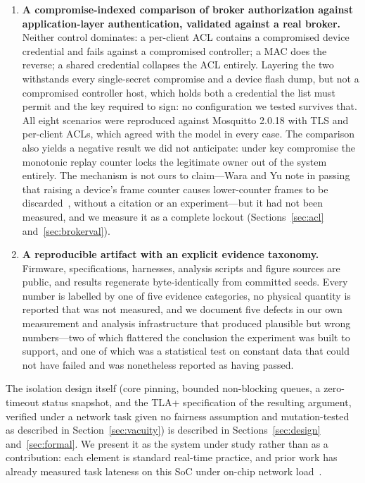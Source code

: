 \begin{enumerate}[leftmargin=1.4em,itemsep=0.25em]
\item \textbf{A compromise-indexed comparison of broker authorization against application-layer
authentication, validated against a real broker.} Neither control dominates: a per-client ACL
contains a compromised device credential and fails against a compromised controller; a MAC does
the reverse; a shared credential collapses the ACL entirely. Layering the two withstands every
single-secret compromise and a device flash dump, but not a compromised controller host, which
holds both a credential the list must permit and the key required to sign: no configuration we
tested survives that. All eight scenarios were reproduced against Mosquitto 2.0.18 with TLS and
per-client ACLs, which agreed with the model in every case. The comparison also
yields a negative result we did not anticipate: under key compromise the monotonic replay
counter locks the legitimate owner out of the system entirely. The mechanism is not ours to
claim---Wara and Yu note in passing that raising a device's frame counter causes lower-counter
frames to be discarded~\cite{wara2020}, without a citation or an experiment---but it had not been
measured, and we measure it as a complete lockout
(Sections~\ref{sec:acl} and~\ref{sec:brokerval}).

\item \textbf{A reproducible artifact with an explicit evidence taxonomy.} Firmware,
specifications, harnesses, analysis scripts and figure sources are public, and results
regenerate byte-identically from committed seeds. Every number is labelled by one of five evidence categories,
no physical quantity is reported that was not measured, and we document five defects in our own
measurement and analysis infrastructure that produced plausible but wrong numbers---two of which
flattered the conclusion the experiment was built to support, and one of which was a statistical
test on constant data that could not have failed and was nonetheless reported as having passed.
\end{enumerate}

The isolation design itself (core pinning, bounded non-blocking queues, a zero-timeout status
snapshot, and the TLA+ specification of the resulting argument, verified under a network task
given no fairness assumption and mutation-tested as described in Section~\ref{sec:vacuity}) is described in Sections~\ref{sec:design}
and~\ref{sec:formal}. We present it as the system under study rather than as a contribution:
each element is standard real-time practice, and prior work has already measured task lateness
on this SoC under on-chip network load~\cite{behnke2020}.

